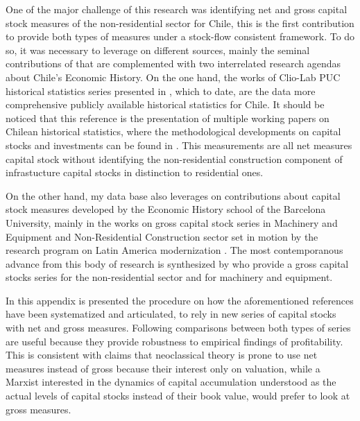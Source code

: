 
One of the major challenge of this research was identifying net and gross capital stock measures of the non-residential sector for Chile, this is the first contribution to provide both types of measures under a stock-flow consistent framework. To do so, it was necessary to leverage on different sources, mainly the seminal contributions of \cite{Hofman2000} that are complemented with two interrelated research agendas about Chile's Economic History. On the one hand, the works of Clio-Lab PUC historical statistics series presented in \citet{Luders2016}, which to date, are the data more comprehensive publicly available historical statistics for Chile. It should be noticed that this reference is the presentation of multiple working papers on Chilean historical statistics, where the methodological developments on capital stocks and investments can be found in \citet{Diaz2016}. This measurements are all net measures capital stock without identifying the non-residential construction component of infrastucture capital stocks in distinction to residential ones. 

On the other hand, my data base also leverages on contributions about capital stock measures developed by the Economic History school of the Barcelona University, mainly in the works on gross capital stock series in Machinery and Equipment and Non-Residential Construction sector set in motion by the research program on Latin America modernization \citep{Carreras2006}. The most contemporanous advance from this body of research is synthesized by \citet{Tafunell2016} who provide a gross capital stocks series for the non-residential sector and for machinery and equipment. 

In this appendix is presented the procedure on how the aforementioned references have been systematized and articulated, to rely in new series of capital stocks with net and gross measures. Following \cite{BasuRama2013} comparisons between both types of series are useful because they provide robustness to empirical findings of profitability. This is consistent with \citet{Shaikh2016} claims that neoclassical theory is prone to use net measures instead of gross because their interest only on valuation, while a Marxist interested in the dynamics of capital accumulation understood as the actual levels of capital stocks instead of their book value, would prefer to look at gross measures. 

